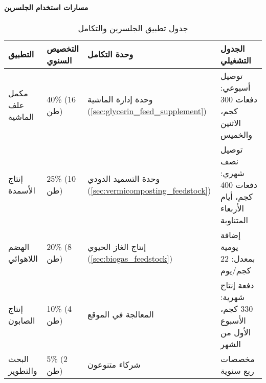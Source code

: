 \paragraph{مسارات استخدام الجلسرين}
\label{sec:glycerin_applications}
\begin{table}[h]
\centering
\caption{جدول تطبيق الجلسرين والتكامل}
\label{tab:glycerin_utilization}
\begin{tabular}{|p{4cm}|p{2.5cm}|p{3cm}|p{4cm}|}
\hline
\textbf{التطبيق} & \textbf{التخصيص السنوي} & \textbf{وحدة التكامل} & \textbf{الجدول التشغيلي} \\
\hline
مكمل علف الماشية & 40\% (16 طن) & وحدة إدارة الماشية (\ref{sec:glycerin_feed_supplement}) & توصيل أسبوعي: دفعات 300 كجم، الاثنين والخميس \\
\hline
إنتاج الأسمدة & 25\% (10 طن) & وحدة التسميد الدودي (\ref{sec:vermicomposting_feedstock}) & توصيل نصف شهري: دفعات 400 كجم، أيام الأربعاء المتناوبة \\
\hline
الهضم اللاهوائي & 20\% (8 طن) & إنتاج الغاز الحيوي (\ref{sec:biogas_feedstock}) & إضافة يومية بمعدل: 22 كجم/يوم \\
\hline
إنتاج الصابون & 10\% (4 طن) & المعالجة في الموقع & دفعة إنتاج شهرية: 330 كجم، الأسبوع الأول من الشهر \\
\hline
البحث والتطوير & 5\% (2 طن) & شركاء متنوعون & مخصصات ربع سنوية \\
\hline
\end{tabular}
\end{table}

